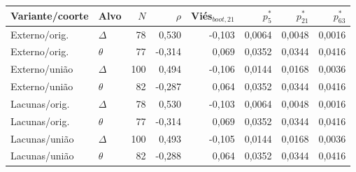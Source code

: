 \begin{tabular}{llrrrrrr}
\toprule
Variante/coorte & Alvo & $N$ & $\rho$ & Viés$_{boot,21}$ & $p^*_{5}$ & $p^*_{21}$ & $p^*_{63}$\\
\midrule
Externo/orig. & $\Delta$ & 78 & 0,530 & -0,103 & 0,0064 & 0,0048 & 0,0016\\
Externo/orig. & $\theta$ & 77 & -0,314 & 0,069 & 0,0352 & 0,0344 & 0,0416\\
Externo/união & $\Delta$ & 100 & 0,494 & -0,106 & 0,0144 & 0,0168 & 0,0036\\
Externo/união & $\theta$ & 82 & -0,287 & 0,064 & 0,0352 & 0,0344 & 0,0416\\
Lacunas/orig. & $\Delta$ & 78 & 0,530 & -0,103 & 0,0064 & 0,0048 & 0,0016\\
Lacunas/orig. & $\theta$ & 77 & -0,314 & 0,069 & 0,0352 & 0,0344 & 0,0416\\
Lacunas/união & $\Delta$ & 100 & 0,493 & -0,105 & 0,0144 & 0,0168 & 0,0036\\
Lacunas/união & $\theta$ & 82 & -0,288 & 0,064 & 0,0352 & 0,0344 & 0,0416\\
\bottomrule
\end{tabular}
